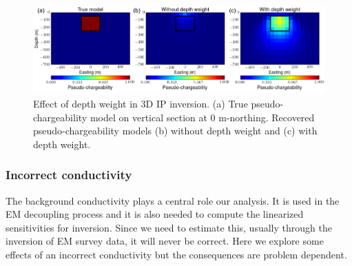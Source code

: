 \documentclass[a4paper, 11pt]{article}
\begin{document}

\begin{figure}[htb]
  \centering
  \includegraphics[width=1.\textwidth]{figures/Depthweight.png}
  \caption{Effect of depth weight in 3D IP inversion. (a) True pseudo-chargeability model on vertical section at 0 m-northing. Recovered pseudo-chargeability models (b) without depth weight and (c) with depth weight.}
  \label{F:Depthweight}
\end{figure}
\clearpage

\subsubsection{Incorrect conductivity}
The background conductivity plays a central role our analysis. It is used in the EM decoupling process and it is also needed to compute the linearized sensitivities for inversion. Since we need to estimate this, usually through the inversion of EM survey data, it will never be correct. Here we explore some effects of an incorrect conductivity but  the consequences are problem dependent.
\end{document}
